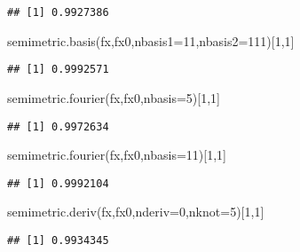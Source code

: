 \documentclass[
]{book}
\newenvironment{Shaded}{\begin{snugshade}}{\end{snugshade}}
\newcommand{\AttributeTok}[1]{\textcolor[rgb]{0.77,0.63,0.00}{#1}}
\newcommand{\DecValTok}[1]{\textcolor[rgb]{0.00,0.00,0.81}{#1}}
\newcommand{\FunctionTok}[1]{\textcolor[rgb]{0.00,0.00,0.00}{#1}}
\newcommand{\NormalTok}[1]{#1}
\begin{document}
\begin{verbatim}
## [1] 0.9927386
\end{verbatim}

\begin{Shaded}
\begin{Highlighting}[]
\FunctionTok{semimetric.basis}\NormalTok{(fx,fx0,}\AttributeTok{nbasis1=}\DecValTok{11}\NormalTok{,}\AttributeTok{nbasis2=}\DecValTok{111}\NormalTok{)[}\DecValTok{1}\NormalTok{,}\DecValTok{1}\NormalTok{]}
\end{Highlighting}
\end{Shaded}

\begin{verbatim}
## [1] 0.9992571
\end{verbatim}

\begin{Shaded}
\begin{Highlighting}[]
\FunctionTok{semimetric.fourier}\NormalTok{(fx,fx0,}\AttributeTok{nbasis=}\DecValTok{5}\NormalTok{)[}\DecValTok{1}\NormalTok{,}\DecValTok{1}\NormalTok{]}
\end{Highlighting}
\end{Shaded}

\begin{verbatim}
## [1] 0.9972634
\end{verbatim}

\begin{Shaded}
\begin{Highlighting}[]
\FunctionTok{semimetric.fourier}\NormalTok{(fx,fx0,}\AttributeTok{nbasis=}\DecValTok{11}\NormalTok{)[}\DecValTok{1}\NormalTok{,}\DecValTok{1}\NormalTok{]}
\end{Highlighting}
\end{Shaded}

\begin{verbatim}
## [1] 0.9992104
\end{verbatim}

\begin{Shaded}
\begin{Highlighting}[]
\FunctionTok{semimetric.deriv}\NormalTok{(fx,fx0,}\AttributeTok{nderiv=}\DecValTok{0}\NormalTok{,}\AttributeTok{nknot=}\DecValTok{5}\NormalTok{)[}\DecValTok{1}\NormalTok{,}\DecValTok{1}\NormalTok{]}
\end{Highlighting}
\end{Shaded}

\begin{verbatim}
## [1] 0.9934345
\end{verbatim}
\end{document}
